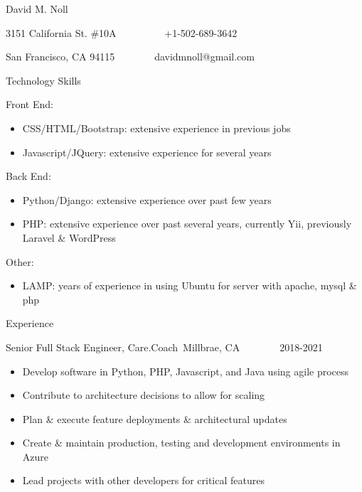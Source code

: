 
{David M. Noll}

{3151 California St. \#10A ~~~~~~~~~+1-502-689-3642}

{San Francisco, CA 94115~~~~~~~~davidmnoll@gmail.com}

{}

{Technology Skills}

{Front End:}

\begin{itemize}
\tightlist
\item
  {CSS/HTML/Bootstrap: extensive experience in previous jobs}
\item
  {Javascript/JQuery: extensive experience for several years}
\end{itemize}

{Back End:}

\begin{itemize}
\tightlist
\item
  {Python/Django: extensive experience over past few years}
\item
  {PHP: extensive experience over past several years, currently Yii,
  previously Laravel \& WordPress}
\end{itemize}

{Other:}

\begin{itemize}
\tightlist
\item
  {LAMP: years of experience in using Ubuntu for server with apache,
  mysql \& php}
\end{itemize}

{}

{}

{}

{Experience}

{}

{}

{Senior Full Stack Engineer, }{Care.Coach}{~}{Millbrae,
CA~~~~~~~~2018-2021}

\begin{itemize}
\tightlist
\item
  {Develop software in Python, PHP, Javascript, and Java u}{sing agile
  process }
\item
  {Contribute to architecture decisions to allow for scaling}
\item
  {Plan \& execute feature deployments \& architectural updates}
\item
  {Create \& maintain production, testing and development environments
  in Azure}
\item
  {Lead projects with other developers for critical features}
\end{itemize}


